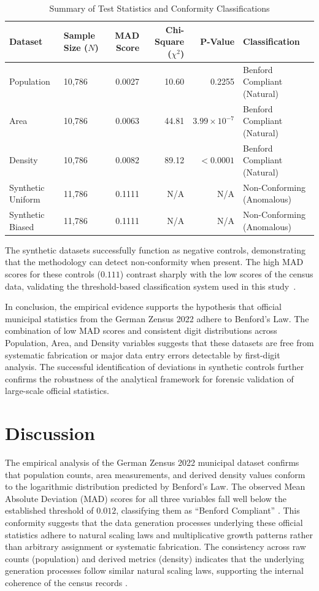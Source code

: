 \documentclass[11pt,a4paper]{article}
\begin{document}
\begin{table}[ht]
\caption{Summary of Test Statistics and Conformity Classifications}
\label{tab:summary_stats}
\centering
\begin{tabular}{@{}llrrrl@{}}
\toprule
Dataset & Sample Size ($N$) & MAD Score & Chi-Square ($\chi^2$) & P-Value & Classification \\
\midrule
Population & 10,786 & 0.0027 & 10.60 & 0.2255 & Benford Compliant (Natural) \\
Area & 10,786 & 0.0063 & 44.81 & $3.99 \times 10^{-7}$ & Benford Compliant (Natural) \\
Density & 10,786 & 0.0082 & 89.12 & $< 0.0001$ & Benford Compliant (Natural) \\
Synthetic Uniform & 11,786 & 0.1111 & N/A & N/A & Non-Conforming (Anomalous) \\
Synthetic Biased & 11,786 & 0.1111 & N/A & N/A & Non-Conforming (Anomalous) \\
\bottomrule
\end{tabular}
\end{table}

The synthetic datasets successfully function as negative controls, demonstrating that the methodology can detect non-conformity when present. The high MAD scores for these controls ($0.111$) contrast sharply with the low scores of the census data, validating the threshold-based classification system used in this study~\cite{Shalini2023DataQA}.

In conclusion, the empirical evidence supports the hypothesis that official municipal statistics from the German Zensus 2022 adhere to Benford's Law. The combination of low MAD scores and consistent digit distributions across Population, Area, and Density variables suggests that these datasets are free from systematic fabrication or major data entry errors detectable by first-digit analysis. The successful identification of deviations in synthetic controls further confirms the robustness of the analytical framework for forensic validation of large-scale official statistics.

\section{Discussion}
The empirical analysis of the German Zensus 2022 municipal dataset confirms that population counts, area measurements, and derived density values conform to the logarithmic distribution predicted by Benford's Law. The observed Mean Absolute Deviation (MAD) scores for all three variables fall well below the established threshold of $0.012$, classifying them as ``Benford Compliant'' \cite{Azevedo2021ABL}. This conformity suggests that the data generation processes underlying these official statistics adhere to natural scaling laws and multiplicative growth patterns rather than arbitrary assignment or systematic fabrication. The consistency across raw counts (population) and derived metrics (density) indicates that the underlying generation processes follow similar natural scaling laws, supporting the internal coherence of the census records \cite{Druica2018BenfordsLA}.
\end{document}
